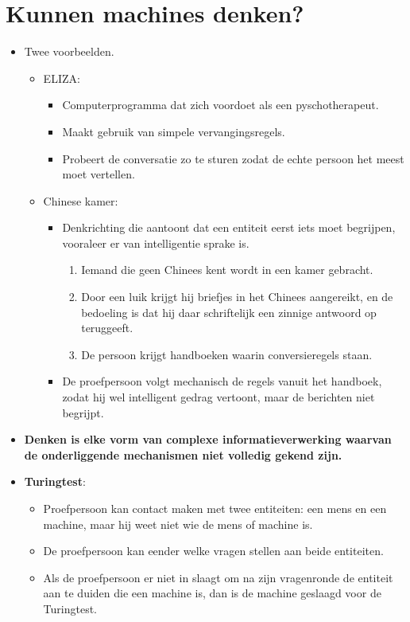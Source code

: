 \documentclass{report}
\begin{document}
\section{Kunnen machines denken?}
\begin{itemize}
	\item Twee voorbeelden.
	\begin{itemize}
		\item ELIZA:
		\begin{itemize}
			\item Computerprogramma dat zich voordoet als een pyschotherapeut.
			\item Maakt gebruik van simpele vervangingsregels.
			\item Probeert de conversatie zo te sturen zodat de echte persoon het meest moet vertellen.
		\end{itemize} 
		\item Chinese kamer:
		\begin{itemize}
			\item Denkrichting die aantoont dat een entiteit eerst iets moet begrijpen, vooraleer er van intelligentie sprake is. 
			\begin{enumerate}
				\item Iemand die geen Chinees kent wordt in een kamer gebracht.
				\item Door een luik krijgt hij briefjes in het Chinees aangereikt, en de bedoeling is dat hij daar schriftelijk een zinnige antwoord op teruggeeft.
				\item De persoon krijgt handboeken waarin conversieregels staan.
			\end{enumerate}
			\item De proefpersoon volgt mechanisch de regels vanuit het handboek, zodat hij wel intelligent gedrag vertoont, maar de berichten niet begrijpt.
		\end{itemize}
	\end{itemize}
	\item \textbf{Denken is elke vorm van complexe informatieverwerking waarvan de onderliggende mechanismen niet volledig gekend zijn.}
	\item \textbf{Turingtest}:
	\begin{itemize}
		\item Proefpersoon kan contact maken met twee entiteiten: een mens en een machine, maar hij weet niet wie de mens of machine is.
		\item De proefpersoon kan eender welke vragen stellen aan beide entiteiten.
		\item Als de proefpersoon er niet in slaagt om na zijn vragenronde de entiteit aan te duiden die een machine is, dan is de machine geslaagd voor de Turingtest.
	\end{itemize} 
\end{itemize}
\end{document}
